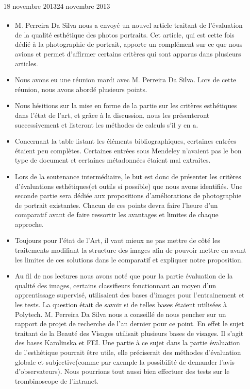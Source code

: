 \documentclass[11pt, french]{report-rd-info}
\begin{document}
\begin{fichesuivi}{18 novembre 2013}{24 novembre 2013}
\paragraph{}
	\begin{echange}
		\begin{itemize}
			\item M. Perreira Da Silva nous a envoyé un nouvel article traitant de l'évaluation de la qualité esthétique des photos portraits. Cet article, qui est cette fois dédié à la photographie de portrait, apporte un complément sur ce que nous avions et permet d'affirmer certains critères qui sont apparus dans plusieurs articles.
			\item Nous avons eu une réunion mardi avec M. Perreira Da Silva. Lors de cette réunion, nous avons abordé plusieurs points.
			\item Nous hésitions sur la mise en forme de la partie sur les critères esthétiques dans l'état de l'art, et grâce à la discussion, nous les présenteront successivement et listeront les méthodes de calculs s'il y en a.
			\item Concernant la table listant les éléments bibliographiques, certaines entrées étaient peu complètes. Certaines entrées sous Mendeley n'avaient pas le bon type de document et certaines métadonnées étaient mal extraites.
			 \item Lors de la soutenance intermédiaire, le but est donc de présenter les critères d'évaluations esthétiques(et outils si possible) que nous avons identifiés. Une seconde partie sera dédiée aux propositions d'améliorations de photographie de portrait existantes. Chacun de ces points devra faire l'heure d'un comparatif avant de faire ressortir les avantages et limites de chaque approche.
			\item Toujours pour l'état de l'Art, il vaut mieux ne pas mettre de côté les traitements modifiant la structure des images afin de pouvoir mettre en avant les limites de ces solutions dans le comparatif et expliquer notre proposition.
			\item Au fil de nos lectures nous avons noté que pour la partie évaluation de la qualité des images, certains classifieurs fonctionnant au moyen d'un apprentissage supervisé, utilisaient des bases d'images pour l'entrainement et les tests. La question était de savoir si de telles bases étaient utilisées à Polytech. M. Perreira Da Silva nous a conseillé de nous pencher sur un rapport de projet de recherche de l'an dernier pour ce point. En effet le sujet traitant de la Beauté des Visages utilisait plusieurs bases de visages. Il s'agit des bases Karolinska et FEI. Une partie à ce sujet dans la partie évaluation de l'esthétique pourrait être utile, elle préciserait des méthodes d'évaluation globale et subjective(comme par exemple la possibilité de demander l'avis d'observateurs). Nous pourrions tout aussi bien effectuer des tests sur le trombinoscope de l'intranet.

\end{itemize}
\end{echange}
\end{fichesuivi}
\end{document}
